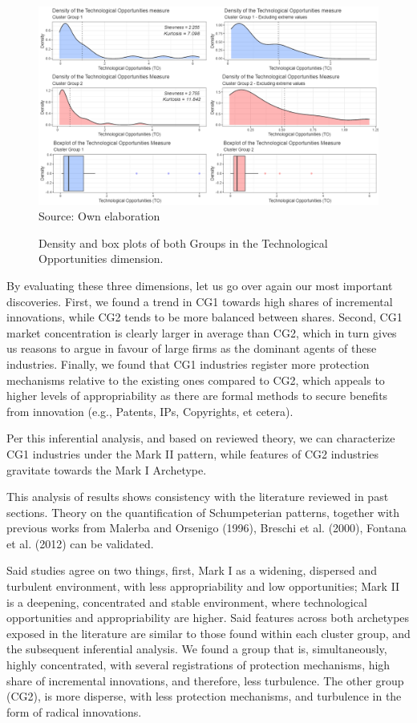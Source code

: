 \documentclass[12pt,a4paper]{article}
\begin{document}
\begin{figure}[H]	
	\caption{Density and box plots of both Groups in the Technological Opportunities dimension.}
	\centering
	\includegraphics[scale = 0.45]{to.png}
		Source: Own elaboration
\end{figure}

By evaluating these three dimensions, let us go over again our most important discoveries. First, we found a trend in CG1 towards high shares of incremental innovations, while CG2 tends to be more balanced between shares. Second, CG1 market concentration is clearly larger in average than CG2, which in turn gives us reasons to argue in favour of large firms as the dominant agents of these industries. Finally, we found that CG1 industries register more protection mechanisms relative to the existing ones compared to CG2, which appeals to higher levels of appropriability as there are formal methods to secure benefits from innovation (e.g., Patents, IPs, Copyrights, et cetera). 

Per this inferential analysis, and based on reviewed theory, we can characterize CG1 industries under the Mark II pattern, while features of CG2 industries gravitate towards the Mark I Archetype. 

This analysis of results shows consistency with the literature reviewed in past sections. Theory on the quantification of Schumpeterian patterns, together with previous works from Malerba and Orsenigo (1996), Breschi et al. (2000), Fontana et al. (2012) can be validated.

Said studies agree on two things, first, Mark I as a widening, dispersed and turbulent environment, with less appropriability and low opportunities; Mark II is a deepening, concentrated and stable environment, where technological opportunities and appropriability are higher. Said features across both archetypes exposed in the literature are similar to those found within each cluster group, and the subsequent inferential analysis. We found a group that is, simultaneously, highly concentrated, with several registrations of protection mechanisms, high share of incremental innovations, and therefore, less turbulence. The other group (CG2),  is more disperse, with less protection mechanisms, and turbulence in the form of radical innovations.
\end{document}
